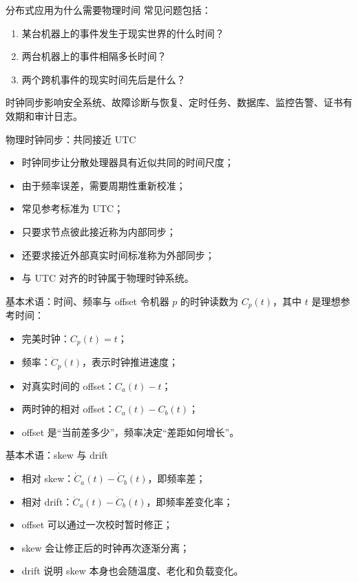 \documentclass[UTF8,fontset=none,aspectratio=169,10pt]{beamer}
\begin{document}
\begin{frame}{分布式应用为什么需要物理时间}
常见问题包括：
\begin{enumerate}
  \item 某台机器上的事件发生于现实世界的什么时间？
  \item 两台机器上的事件相隔多长时间？
  \item 两个跨机事件的现实时间先后是什么？
\end{enumerate}
\vfill
时钟同步影响安全系统、故障诊断与恢复、定时任务、数据库、监控告警、证书有效期和审计日志。
\vfill
{}
\end{frame}

\begin{frame}{物理时钟同步：共同接近 UTC}
\begin{itemize}
  \item 时钟同步让分散处理器具有近似共同的时间尺度；
  \item 由于频率误差，需要周期性重新校准；
  \item 常见参考标准为 UTC；
  \item 只要求节点彼此接近称为内部同步；
  \item 还要求接近外部真实时间标准称为外部同步；
  \item 与 UTC 对齐的时钟属于物理时钟系统。
\end{itemize}
\end{frame}

\begin{frame}{基本术语：时间、频率与 offset}
令机器 $p$ 的时钟读数为 $C_p(t)$，其中 $t$ 是理想参考时间：
\begin{itemize}
  \item 完美时钟：$C_p(t)=t$；
  \item 频率：$\dot C_p(t)$，表示时钟推进速度；
  \item 对真实时间的 offset：$C_a(t)-t$；
  \item 两时钟的相对 offset：$C_a(t)-C_b(t)$；
  \item offset 是“当前差多少”，频率决定“差距如何增长”。
\end{itemize}
\end{frame}

\begin{frame}{基本术语：skew 与 drift}
\begin{itemize}
  \item 相对 skew：$\dot C_a(t)-\dot C_b(t)$，即频率差；
  \item 相对 drift：$\ddot C_a(t)-\ddot C_b(t)$，即频率差变化率；
  \item offset 可以通过一次校时暂时修正；
  \item skew 会让修正后的时钟再次逐渐分离；
  \item drift 说明 skew 本身也会随温度、老化和负载变化。
\end{itemize}
\vfill
{}
\end{frame}
\end{document}

